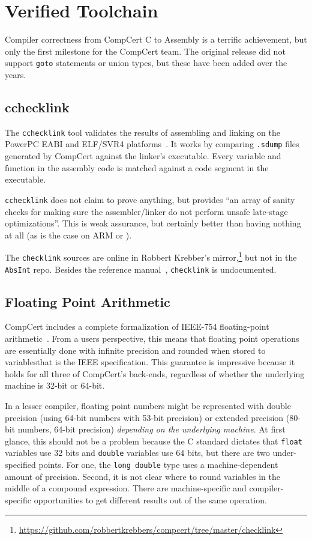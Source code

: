\section{Verified Toolchain}

Compiler correctness from CompCert C to Assembly is a terrific achievement, but only the first milestone for the CompCert team.
The original release did not support \lstinline{goto} statements or union types, but these have been added over the years.


\subsection{cchecklink}
\label{checklink}

The {\tt cchecklink} tool validates the results of assembling and linking on the PowerPC EABI and ELF/SVR4 platforms~\cite{refman}.
It works by comparing {\tt .sdump} files generated by CompCert against the linker's executable.
Every variable and function in the assembly code is matched against a code segment in the executable.

{\tt cchecklink} does not claim to prove anything, but provides ``an array of sanity checks for making sure the assembler/linker do not perform unsafe late-stage optimizations''.
This is weak assurance, but certainly better than having nothing at all (as is the case on ARM or \intel).

The {\tt checklink} sources are online in Robbert Krebber's mirror,\footnote{\url{https://github.com/robbertkrebbers/compcert/tree/master/checklink}} but not in the {\tt AbsInt} repo.
Besides the reference manual~\cite{refman}, {\tt checklink} is undocumented.


\subsection{Floating Point Arithmetic}
CompCert includes a complete formalization of IEEE-754 floating-point arithmetic~\cite{ieee-754,bjlm-floating}.
From a users perspective, this means that floating point operations are essentially done with infinite precision and rounded when stored to variables\textemdash that is the IEEE specification.
This guarantee is impressive because it holds for all three of CompCert's back-ends, regardless of whether the underlying machine is 32-bit or 64-bit.

In a lesser compiler, floating point numbers might be represented with double precision (using 64-bit numbers with 53-bit precision) or extended precision (80-bit numbers, 64-bit precision) \emph{depending on the underlying machine}.
At first glance, this should not be a problem because the C standard dictates that \lstinline{float} variables use 32 bits and \lstinline{double} variables use 64 bits, but there are two under-specified points.
For one, the \lstinline{long double} type uses a machine-dependent amount of precision.
Second, it is not clear where to round variables in the middle of a compound expression.
There are machine-specific and compiler-specific opportunities to get different results out of the same operation.

